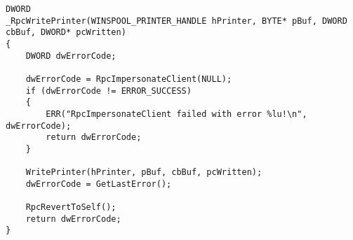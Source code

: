 \begin{lstlisting}
DWORD
_RpcWritePrinter(WINSPOOL_PRINTER_HANDLE hPrinter, BYTE* pBuf, DWORD cbBuf, DWORD* pcWritten)
{
    DWORD dwErrorCode;

    dwErrorCode = RpcImpersonateClient(NULL);
    if (dwErrorCode != ERROR_SUCCESS)
    {
        ERR("RpcImpersonateClient failed with error %lu!\n", dwErrorCode);
        return dwErrorCode;
    }

    WritePrinter(hPrinter, pBuf, cbBuf, pcWritten);
    dwErrorCode = GetLastError();

    RpcRevertToSelf();
    return dwErrorCode;
}
\end{lstlisting}
